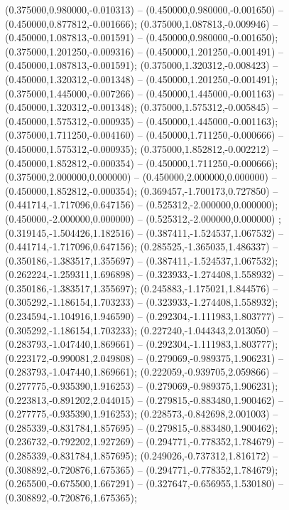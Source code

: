  (0.375000,0.980000,-0.010313) -- (0.450000,0.980000,-0.001650) -- (0.450000,0.877812,-0.001666);
 (0.375000,1.087813,-0.009946) -- (0.450000,1.087813,-0.001591) -- (0.450000,0.980000,-0.001650);
 (0.375000,1.201250,-0.009316) -- (0.450000,1.201250,-0.001491) -- (0.450000,1.087813,-0.001591);
 (0.375000,1.320312,-0.008423) -- (0.450000,1.320312,-0.001348) -- (0.450000,1.201250,-0.001491);
 (0.375000,1.445000,-0.007266) -- (0.450000,1.445000,-0.001163) -- (0.450000,1.320312,-0.001348);
 (0.375000,1.575312,-0.005845) -- (0.450000,1.575312,-0.000935) -- (0.450000,1.445000,-0.001163);
 (0.375000,1.711250,-0.004160) -- (0.450000,1.711250,-0.000666) -- (0.450000,1.575312,-0.000935);
 (0.375000,1.852812,-0.002212) -- (0.450000,1.852812,-0.000354) -- (0.450000,1.711250,-0.000666);
 (0.375000,2.000000,0.000000) -- (0.450000,2.000000,0.000000) -- (0.450000,1.852812,-0.000354);
 (0.369457,-1.700173,0.727850) -- (0.441714,-1.717096,0.647156) -- (0.525312,-2.000000,0.000000);
 (0.450000,-2.000000,0.000000) -- (0.525312,-2.000000,0.000000) ;
 (0.319145,-1.504426,1.182516) -- (0.387411,-1.524537,1.067532) -- (0.441714,-1.717096,0.647156);
 (0.285525,-1.365035,1.486337) -- (0.350186,-1.383517,1.355697) -- (0.387411,-1.524537,1.067532);
 (0.262224,-1.259311,1.696898) -- (0.323933,-1.274408,1.558932) -- (0.350186,-1.383517,1.355697);
 (0.245883,-1.175021,1.844576) -- (0.305292,-1.186154,1.703233) -- (0.323933,-1.274408,1.558932);
 (0.234594,-1.104916,1.946590) -- (0.292304,-1.111983,1.803777) -- (0.305292,-1.186154,1.703233);
 (0.227240,-1.044343,2.013050) -- (0.283793,-1.047440,1.869661) -- (0.292304,-1.111983,1.803777);
 (0.223172,-0.990081,2.049808) -- (0.279069,-0.989375,1.906231) -- (0.283793,-1.047440,1.869661);
 (0.222059,-0.939705,2.059866) -- (0.277775,-0.935390,1.916253) -- (0.279069,-0.989375,1.906231);
 (0.223813,-0.891202,2.044015) -- (0.279815,-0.883480,1.900462) -- (0.277775,-0.935390,1.916253);
 (0.228573,-0.842698,2.001003) -- (0.285339,-0.831784,1.857695) -- (0.279815,-0.883480,1.900462);
 (0.236732,-0.792202,1.927269) -- (0.294771,-0.778352,1.784679) -- (0.285339,-0.831784,1.857695);
 (0.249026,-0.737312,1.816172) -- (0.308892,-0.720876,1.675365) -- (0.294771,-0.778352,1.784679);
 (0.265500,-0.675500,1.667291) -- (0.327647,-0.656955,1.530180) -- (0.308892,-0.720876,1.675365);
